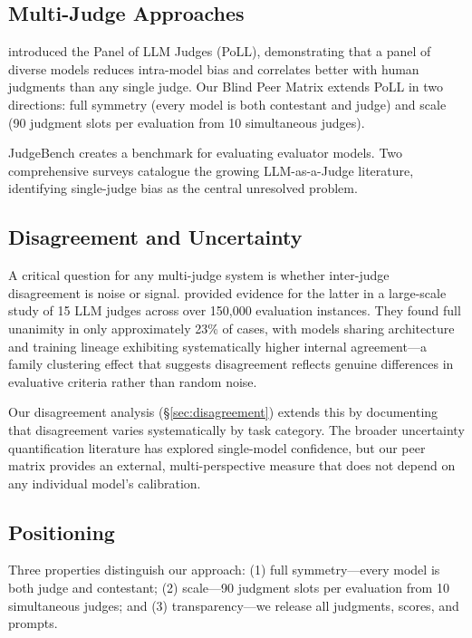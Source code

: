 \documentclass{article}
\begin{document}
\subsection{Multi-Judge Approaches}

\citet{verga2024replacing} introduced the Panel of LLM Judges (PoLL), demonstrating that a panel of diverse models reduces intra-model bias and correlates better with human judgments than any single judge. Our Blind Peer Matrix extends PoLL in two directions: full symmetry (every model is both contestant and judge) and scale (90 judgment slots per evaluation from 10 simultaneous judges).

JudgeBench \citep{tan2024judgebench} creates a benchmark for evaluating evaluator models. Two comprehensive surveys \citep{li2024generation, gu2024survey} catalogue the growing LLM-as-a-Judge literature, identifying single-judge bias as the central unresolved problem.

\subsection{Disagreement and Uncertainty}

A critical question for any multi-judge system is whether inter-judge disagreement is noise or signal. \citet{shi2024judging} provided evidence for the latter in a large-scale study of 15 LLM judges across over 150,000 evaluation instances. They found full unanimity in only approximately 23\% of cases, with models sharing architecture and training lineage exhibiting systematically higher internal agreement---a family clustering effect that suggests disagreement reflects genuine differences in evaluative criteria rather than random noise.

Our disagreement analysis (\S\ref{sec:disagreement}) extends this by documenting that disagreement varies systematically by task category. The broader uncertainty quantification literature \citep{gal2016dropout, xiao2019quantifying} has explored single-model confidence, but our peer matrix provides an external, multi-perspective measure that does not depend on any individual model's calibration.

\subsection{Positioning}

Three properties distinguish our approach: (1) full symmetry---every model is both judge and contestant; (2) scale---90 judgment slots per evaluation from 10 simultaneous judges; and (3) transparency---we release all judgments, scores, and prompts.
\end{document}
